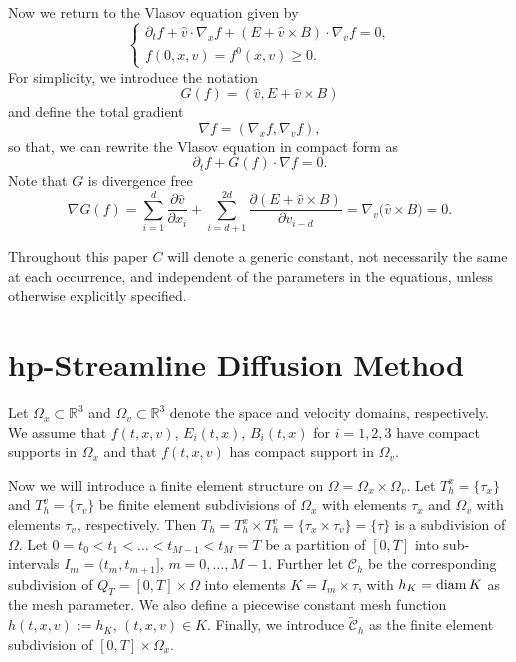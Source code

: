 \documentclass[reqno,a4paper]{amsart}
\theoremstyle{remark}
\numberwithin{equation}{section}
\def\d{\partial}
\def\R{{\mathbb R}}
\begin{document}
Now we return to the Vlasov equation given by
\begin{equation} \label{vlasov}
\left\{ \begin{array}{ll}
\d_t f +\hat v\cdot \nabla_x f+(E+\hat{v}\times B)\cdot \nabla_v f=0,\\
f(0,x,v) = f^0 (x,v) \geq 0.
\end{array} \right. 
\end{equation}
For simplicity, we introduce the notation
$$
G(f)=(\hat{v}, E+\hat{v}\times B)
$$
and define the total gradient 
$$
\nabla f = ( \nabla_x f , \nabla_v f ), 
$$
so that, we can rewrite the Vlasov equation in compact form as 
$$
\d_t f + G(f) \cdot \nabla f =0 .
$$
Note that $G$ is divergence free
\begin{equation*}
\nabla G(f)=\sum_{i=1}^d\frac{\d\hat{v}}{\d x_i}
+\sum_{i=d+1}^{2d}\frac{\d(E+\hat{v}\times B)}{\d v_{i-d}}
=\nabla_v\big(\hat{v}\times B\big)=0.
\end{equation*}

Throughout this paper $C$ will denote a generic constant, 
not necessarily the same at each occurrence, and independent of the parameters 
in the equations, unless otherwise explicitly specified. 


\section{hp-Streamline Diffusion Method}

Let $\Omega_x\subset\R^3$ and $\Omega_v\subset\R^3$ denote the space 
and velocity domains,
respectively. We assume that $f(t,x,v)$, $E_i(t,x)$, 
$B_i(t,x)$ for $i=1,2,3$ have compact
supports in $\Omega_x$ and that $f(t,x,v)$ has compact support in $\Omega_v$.

Now we will introduce a finite element structure on 
$\Omega=\Omega_x\times\Omega_v$.
Let $T_h^x = \{ \tau_x \}$ and $T_h^v = \{ \tau_v \}$ 
be finite element subdivisions
of $\Omega_x$ with elements $\tau_x$ and $\Omega_v$ with elements 
$\tau_v$, respectively.
Then 
$T_h = T_h^x \times T_h^v = \{ \tau_x \times \tau_v \} = \{ \tau \}$ 
is a subdivision
of $\Omega$.
Let $0= t_0 < t_1 < \ldots < t_{M-1} < t_M=T$ be a partition of $[ 0, T ]$ into
sub-intervals $I_m = (t_m, t_{m+1} ]$, $m= 0, \ldots , M-1$.
Further let $\mathcal{C}_h$ be the corresponding subdivision of 
$Q_T=[0,T]\times\Omega$
into elements $K=I_m\times\tau$, with 
$h_K=\textnormal{diam}\,K$ as the mesh parameter.
We also define a piecewise constant mesh function $
h(t,x,v):=h_K$, $(t,x,v)\in K$. Finally, we 
introduce $\mathcal{\tilde{C}}_h$ as the finite element subdivision of 
$[0,T]\times\Omega_x$. 
\end{document}
